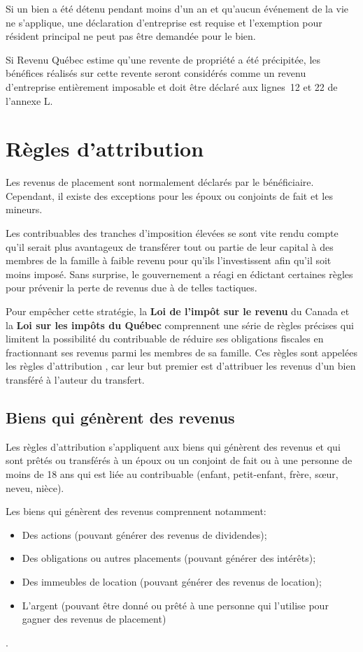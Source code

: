 Si un bien a été détenu pendant moins d'un an et qu'aucun événement de la vie ne s'applique, une déclaration d'entreprise est requise et l'exemption pour résident principal ne peut pas être demandée pour le bien.

Si Revenu Québec estime qu'une revente de propriété a été précipitée, les bénéfices réalisés sur cette revente seront considérés comme un revenu d'entreprise entièrement imposable et doit être déclaré aux lignes~12 et 22 de l'annexe L.



\section{Règles d'attribution}
\begin{intro}
	Les revenus de placement sont normalement déclarés par le bénéficiaire. Cependant, il existe des exceptions pour les époux ou conjoints de fait et les mineurs.
\end{intro}

Les contribuables des tranches d'imposition élevées se sont vite rendu compte qu'il serait plus avantageux de transférer tout ou partie de leur capital à des membres de la famille à faible revenu pour qu'ils l'investissent afin qu'il soit moins imposé. Sans surprise, le gouvernement a réagi en édictant certaines règles pour prévenir la perte de revenus due à de telles tactiques.

Pour empêcher cette stratégie, la \textbf{Loi de l'impôt sur le revenu} du Canada et la \textbf{Loi sur les impôts du Québec} comprennent une série de règles précises qui limitent la possibilité du contribuable de réduire ses obligations fiscales en fractionnant ses revenus parmi les membres de sa famille. Ces règles sont appelées les \og règles d'attribution \fg{}, car leur but premier est d'attribuer les revenus d'un bien transféré à l'auteur du transfert.


\subsection{Biens qui génèrent des revenus}
Les règles d'attribution s'appliquent aux biens qui génèrent des revenus et qui sont prêtés ou transférés à un époux ou un conjoint de fait ou à une personne de moins de 18 ans qui est liée au contribuable (enfant, petit-enfant, frère, sœur, neveu, nièce).

Les biens qui génèrent des revenus comprennent notamment:
\begin{itemize}[label=]
	\item Des actions (pouvant générer des revenus de dividendes);
	\item Des obligations ou autres placements (pouvant générer des intérêts);
	\item Des immeubles de location (pouvant générer des revenus de location);
	\item L'argent (pouvant être donné ou prêté à une personne qui l'utilise pour gagner des revenus de placement)
\end{itemize}.

